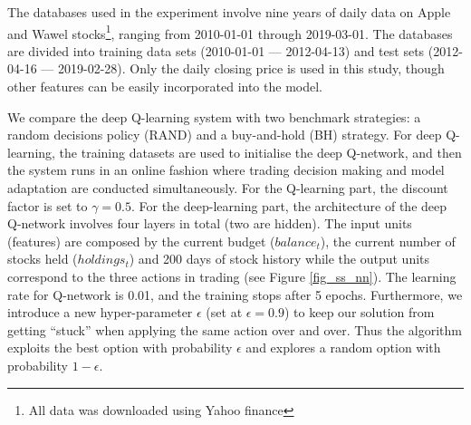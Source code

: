 \documentclass[12pt, authoryear]{elsarticle}
\begin{document}
The databases used in the experiment involve nine years of daily data on Apple and Wawel stocks\footnote{All data was downloaded using Yahoo finance}, ranging from  2010-01-01 through 2019-03-01. The databases are divided into training data sets (2010-01-01 --- 2012-04-13) and test sets (2012-04-16 --- 2019-02-28). Only the daily closing price is used in this study, though other features can be easily incorporated into the model.

We compare the deep Q-learning system with two benchmark strategies: a random decisions policy (RAND) and a buy-and-hold (BH) strategy. For deep Q-learning, the training datasets are used to initialise the deep Q-network, and then the system runs in an online fashion where trading decision making and model adaptation are conducted simultaneously. For the Q-learning part, the discount factor is set to $\gamma =  0.5$. For the deep-learning part, the architecture of the deep Q-network involves four layers in total (two are hidden). The input units (features) are composed by the current budget ($balance_{t}$), the current number of stocks held ($holdings_{t}$) and 200 days of stock history while the output units correspond to the three actions in trading (see Figure \ref{fig_ss_nn}). The learning rate for Q-network is 0.01, and the training stops after 5 epochs. Furthermore, we introduce a new hyper-parameter $\epsilon$ (set at $\epsilon = 0.9$) to keep our solution from getting ``stuck'' when applying the same action over and over. Thus the algorithm exploits the best option with probability $\epsilon$ and explores a random option with probability $1 - \epsilon$.
	
\end{document}
